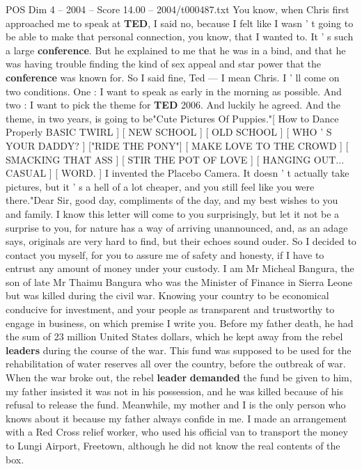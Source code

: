 \begin{textsample}{POS Dim 4 – 2004 – Score 14.00 – 2004/t000487.txt}  \label{ex:f4_pos_058}
You know, when Chris first approached me to speak at \textbf{TED}, I said no, because I felt like I wasn ' t going to be able to make that personal connection, you know, that I wanted to.
It ' s such a large \textbf{conference}.
But he explained to me that he was in a bind, and that he was having trouble finding the kind of sex appeal and star power that the \textbf{conference} was known for.
So I said fine, Ted — I mean Chris.
I ' ll come on two conditions.
One : I want to speak as early in the morning as possible.
And two : I want to pick the theme for \textbf{TED} 2006.
And luckily he agreed.
And the theme, in two years, is going to be"Cute Pictures Of Puppies."[ How to Dance Properly BASIC TWIRL ] [ NEW SCHOOL ] [ OLD SCHOOL ] [ WHO ' S YOUR DADDY? ] ["RIDE THE PONY"] [ MAKE LOVE TO THE CROWD ] [ SMACKING THAT ASS ] [ STIR THE POT OF LOVE ] [ HANGING OUT...
CASUAL ] [ WORD. ] I invented the Placebo Camera.
It doesn ' t actually take pictures, but it ' s a hell of a lot cheaper, and you still feel like you were there."Dear Sir, good day, compliments of the day, and my best wishes to you and family.
I know this letter will come to you surprisingly, but let it not be a surprise to you, for nature has a way of arriving unannounced, and, as an adage says, originals are very hard to find, but their echoes sound ouder.
So I decided to contact you myself, for you to assure me of safety and honesty, if I have to entrust any amount of money under your custody.
I am Mr Micheal Bangura, the son of late Mr Thaimu Bangura who was the Minister of Finance in Sierra Leone but was killed during the civil war.
Knowing your country to be economical conducive for investment, and your people as transparent and trustworthy to engage in business, on which premise I write you.
Before my father death, he had the sum of 23 million United States dollars, which he kept away from the rebel \textbf{leaders} during the course of the war.
This fund was supposed to be used for the rehabilitation of water reserves all over the country, before the outbreak of war.
When the war broke out, the rebel \textbf{leader} \textbf{demanded} the fund be given to him, my father insisted it was not in his possession, and he was killed because of his refusal to release the fund.
Meanwhile, my mother and I is the only person who knows about it because my father always confide in me.
I made an arrangement with a Red Cross relief worker, who used his official van to transport the money to Lungi Airport, Freetown, although he did not know the real contents of the box.

\end{textsample}
